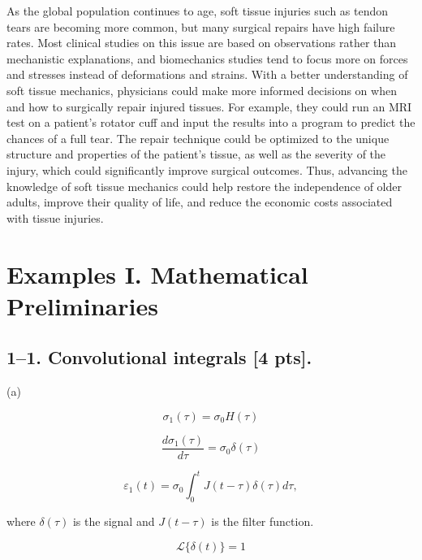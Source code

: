 \documentclass{article}
\begin{document}
As the global population continues to age, soft tissue injuries such as tendon tears are becoming more common, but many surgical repairs have high failure rates. Most clinical studies on this issue are based on observations rather than mechanistic explanations, and biomechanics studies tend to focus more on forces and stresses instead of deformations and strains. With a better understanding of soft tissue mechanics, physicians could make more informed decisions on when and how to surgically repair injured tissues. For example, they could run an MRI test on a patient's rotator cuff and input the results into a program to predict the chances of a full tear. The repair technique could be optimized to the unique structure and properties of the patient's tissue, as well as the severity of the injury, which could significantly improve surgical outcomes. Thus, advancing the knowledge of soft tissue mechanics could help restore the independence of older adults, improve their quality of life, and reduce the economic costs associated with tissue injuries.

\newpage


\section*{Examples I. Mathematical Preliminaries}

\subsection*{1--1. \textbf{Convolutional integrals} [4 pts].}

(a) 

\begin{equation*}
    \sigma_1(\tau) = \sigma_0 H(\tau)
\end{equation*}

\begin{equation*}
    \frac{d\sigma_1(\tau)}{d\tau} = \sigma_0\delta(\tau)
\end{equation*}

\begin{equation}
    \varepsilon_1(t) = \sigma_0 \int_0^t J(t-\tau) \delta(\tau) d\tau,
\end{equation}

where $\delta(\tau)$ is the signal and $J(t-\tau)$ is the filter function.

\bigskip

\begin{equation*}
    \mathcal{L}\{\delta(t)\} =1
\end{equation*}
\end{document}
